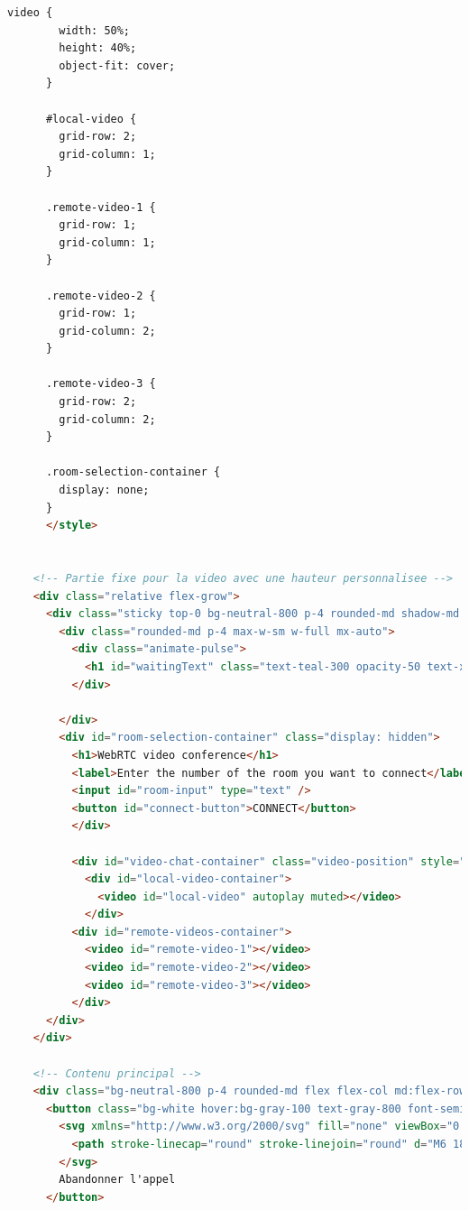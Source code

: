 \documentclass[12pt, a4paper, oneside]{thesis}
\begin{document}
\begin{lstlisting}[language=HTML, caption={Page - Réunions}, label=Page - Reunions]
      video {
        width: 50%;
        height: 40%;
        object-fit: cover;
      }
    
      #local-video {
        grid-row: 2;
        grid-column: 1;
      }
    
      .remote-video-1 {
        grid-row: 1;
        grid-column: 1;
      }
    
      .remote-video-2 {
        grid-row: 1;
        grid-column: 2;
      }
    
      .remote-video-3 {
        grid-row: 2;
        grid-column: 2;
      }
  
      .room-selection-container {
        display: none;
      }
      </style>
  
  
    <!-- Partie fixe pour la video avec une hauteur personnalisee -->
    <div class="relative flex-grow">
      <div class="sticky top-0 bg-neutral-800 p-4 rounded-md shadow-md h-16 my-8 min-h-[300px] flex items-center justify-center">
        <div class="rounded-md p-4 max-w-sm w-full mx-auto">
          <div class="animate-pulse">
            <h1 id="waitingText" class="text-teal-300 opacity-50 text-xl text-center">En attente de la connexion a la reunion</h1>
          </div>
  
        </div>
        <div id="room-selection-container" class="display: hidden">
          <h1>WebRTC video conference</h1>
          <label>Enter the number of the room you want to connect</label>
          <input id="room-input" type="text" />
          <button id="connect-button">CONNECT</button>
          </div>
        
          <div id="video-chat-container" class="video-position" style="display: none">
            <div id="local-video-container">
              <video id="local-video" autoplay muted></video>
            </div>
          <div id="remote-videos-container">
            <video id="remote-video-1"></video>
            <video id="remote-video-2"></video>
            <video id="remote-video-3"></video>
          </div>
      </div>
    </div>
  
    <!-- Contenu principal -->
    <div class="bg-neutral-800 p-4 rounded-md flex flex-col md:flex-row justify-center items-center space-y-4 md:space-y-0 md:space-x-8" data-astro-cid-j7pv25f6="">
      <button class="bg-white hover:bg-gray-100 text-gray-800 font-semibold py-2 px-4 border border-gray-400 rounded shadow flex items-center" id="hangup-button" data-astro-cid-j7pv25f6="">
        <svg xmlns="http://www.w3.org/2000/svg" fill="none" viewBox="0 0 24 24" stroke-width="1.5" stroke="currentColor" class="w-6 h-6 mr-2" data-astro-cid-j7pv25f6="">
          <path stroke-linecap="round" stroke-linejoin="round" d="M6 18L18 6M6 6l12 12" data-astro-cid-j7pv25f6=""></path>
        </svg>
        Abandonner l'appel
      </button>
    

\end{lstlisting}
\end{document}
